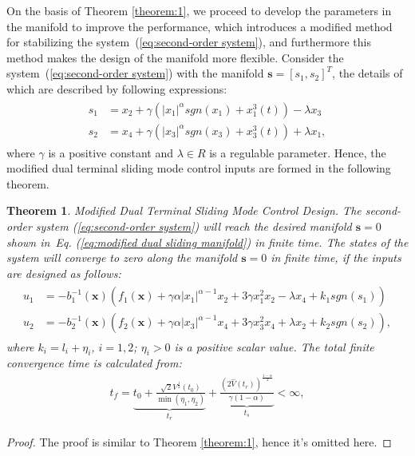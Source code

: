 \documentclass[3p]{elsarticle}
\theoremstyle{plain}
\newtheorem{mythm}{Theorem}
\theoremstyle{remark}
\begin{document}
On the basis of Theorem \ref{theorem:1}, we proceed to develop the parameters in the manifold to improve the performance, which introduces a modified method for stabilizing the system~(\ref{eq:second-order system}), and furthermore this method makes the design of the manifold more flexible. Consider the system~(\ref{eq:second-order system}) with the manifold $\bm s = [s_1,s_2]^T$, the details of which are described by following expressions:
\begin{align}
\begin{split}
s_1 &= x_2+\gamma(\vert x_1\vert^{\alpha} sgn(x_1)+x_1^3(t))-\lambda x_3\\
s_2 &= x_4+\gamma(\vert x_3\vert^{\alpha} sgn(x_3)+x_3^3(t))+\lambda x_1,\label{eq:modified dual sliding manifold}
\end{split}
\end{align}
where $\gamma$ is a positive constant and $\lambda\in R$ is a regulable parameter. Hence, the modified dual terminal sliding mode control inputs are formed in the following theorem.
\begin{mythm}\label{theorem:2}Modified Dual Terminal Sliding Mode Control Design.
The second-order system (\ref{eq:second-order system}) will reach the desired manifold $\bm s = 0$ shown in~Eq. (\ref{eq:modified dual sliding manifold}) in finite time. The states of the system will converge to zero along the manifold $\bm s=0$ in finite time, if the inputs are designed as follows:
\begin{align}
\begin{split}
u_1 &= -b_1^{-1}(\bm x)(f_1(\bm x)+\gamma\alpha\vert x_1\vert^{\alpha-1}x_2+3\gamma x_1^2x_2-\lambda x_4+k_1sgn(s_1))\\
u_2 &= -b_2^{-1}(\bm x)(f_2(\bm x)+\gamma\alpha\vert x_3\vert^{\alpha-1}x_4+3\gamma x_3^2x_4+\lambda x_2+k_2sgn(s_2)),\label{eq:modified input}
\end{split}
\end{align}
where $k_i = l_i+\eta_i$, $i=1,2$; $\eta_i>0$ is a positive scalar value. The total finite convergence time is calculated from:
\begin{align}
t_f = \underbrace{t_0+\frac{\sqrt{2}V^{\frac{1}{2}}(t_0)}{\min(\eta_1,\eta_2)}}_{t_r}+\underbrace{\frac{(2\hat V(t_r))^{\frac{1-\alpha}{2}}}{\gamma(1-\alpha)}}_{t_s}<\infty,\label{eq:total convergence time}
\end{align}
\end{mythm}
\begin{proof}
The proof is similar to Theorem \ref{theorem:1}, hence it's omitted here.
\end{proof}
\end{document}

